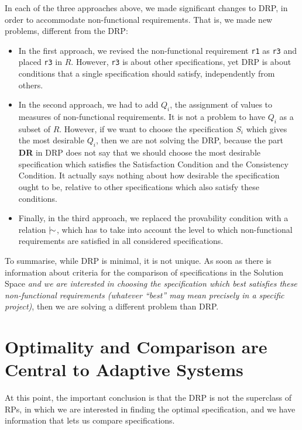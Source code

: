 \documentclass[graybox]{svmult}
\newcommand{\zi}[1]{\textit{#1}}
\newcommand{\xb}[1]{\textbf{#1}}
\newcommand{\xt}[1]{\texttt{#1}}
\newcommand{\req}[1]{\xt{#1}}
\newcommand{\RP}{RP}
\newcommand{\ASfull}{Adaptive System}
\newcommand{\ZJRP}{DRP}
\newcommand{\SatisfactionCondition}{Satisfaction Condition}
\newcommand{\ConsistencyCondition}{Consistency Condition}
\newcommand{\nmdash}{\mid\negthinspace\sim}
\newcommand{\SolutionSpace}{Solution Space}
\begin{document}
In each of the three approaches above, we made significant changes to \ZJRP, in order to accommodate non-functional requirements. That is, we made new problems, different from the \ZJRP:
\begin{itemize}
    \item{In the first approach, we revised the non-functional requirement \req{r1} as \req{r3} and placed \req{r3} in $R$. However, \req{r3} is about other specifications, yet \ZJRP{} is about conditions that a single specification should satisfy, independently from others.}
    \item{In the second approach, we had to add $Q_{i}$, the assignment of values to measures of non-functional requirements. It is not a problem to have $Q_{i}$ as a subset of $R$. However, if we want to choose the specification $S_{i}$ which gives the most desirable $Q_{i}$, then we are not solving the \ZJRP, because the part \xb{DR} in \ZJRP{} does not say that we should choose the most desirable specification which satisfies the \SatisfactionCondition{} and the \ConsistencyCondition. It actually says nothing about how desirable the specification ought to be, relative to other specifications which also satisfy these conditions.} 
    \item{Finally, in the third approach, we replaced the provability condition with a relation $\nmdash$, which has to take into account the level to which non-functional requirements are satisfied in all considered specifications.}
\end{itemize}

To summarise, while \ZJRP{} is minimal, it is not unique. As soon as there is information about criteria for the comparison of specifications in the \SolutionSpace{} \zi{and we are interested in choosing the specification which best satisfies these non-functional requirements (whatever ``best'' may mean precisely in a specific project)}, then we are solving a different problem than \ZJRP.



%
\section{Optimality and Comparison are Central to \ASfull s}\label{s:optimality-criteria-importance}
At this point, the important conclusion is that the \ZJRP{} is not the superclass of \RP s, in which we are interested in finding the optimal specification, and we have information that lets us compare specifications.
\end{document}
